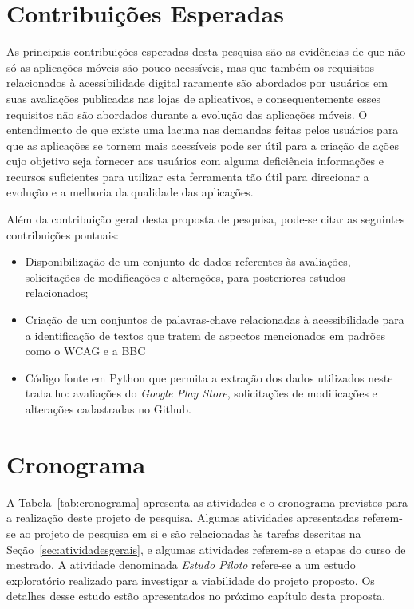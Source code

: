\section{Contribuições Esperadas}

As principais contribuições esperadas desta pesquisa são as evidências de que não só as aplicações móveis são pouco acessíveis, mas que também os requisitos relacionados à acessibilidade digital raramente são abordados por usuários em suas avaliações publicadas nas lojas de aplicativos, e consequentemente esses requisitos não são abordados durante a evolução das aplicações móveis.
O entendimento de que existe uma lacuna nas demandas feitas pelos usuários para que as aplicações se tornem mais acessíveis pode ser útil para a criação de ações cujo objetivo seja fornecer aos usuários com alguma deficiência informações e recursos suficientes para utilizar esta ferramenta tão útil para direcionar a evolução e a melhoria da qualidade das aplicações. 

Além da contribuição geral desta proposta de pesquisa, pode-se citar as seguintes contribuições pontuais:
\begin{itemize}
	\item Disponibilização de um conjunto de dados referentes às avaliações, solicitações de modificações e alterações, para posteriores estudos relacionados;
	\item Criação de um conjuntos de palavras-chave relacionadas à acessibilidade para a identificação de textos que tratem de aspectos mencionados em padrões como o WCAG e a BBC
	\item Código fonte em Python que permita a extração dos dados utilizados neste trabalho: avaliações do \textit{Google Play Store}, solicitações de modificações e alterações cadastradas no Github.
\end{itemize}




\section{Cronograma}
\label{sec:cronograma}

A Tabela~\ref{tab:cronograma} apresenta as atividades e o cronograma previstos para a realização deste projeto de pesquisa. Algumas atividades apresentadas referem-se ao projeto de pesquisa em si e são relacionadas às tarefas descritas na Seção~\ref{sec:atividadesgerais}, e algumas atividades referem-se a etapas do curso de mestrado. A atividade denominada \emph{Estudo Piloto} refere-se a um estudo exploratório realizado para investigar a viabilidade do projeto proposto. Os detalhes desse estudo estão apresentados no próximo capítulo desta proposta.



